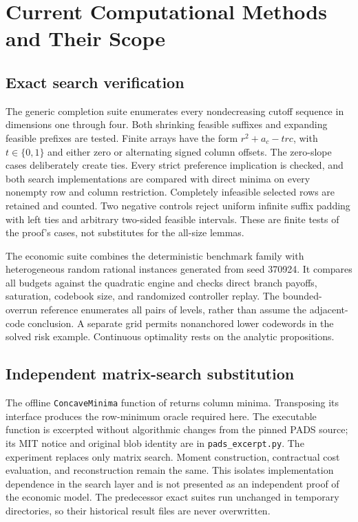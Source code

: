 \section{Current Computational Methods and Their Scope}\label{ec:r37-methods}
\subsection{Exact search verification}
The generic completion suite enumerates every nondecreasing cutoff sequence in dimensions one through four. Both shrinking feasible suffixes and expanding feasible prefixes are tested. Finite arrays have the form $r^2+a_c-trc$, with $t\in\{0,1\}$ and either zero or alternating signed column offsets. The zero-slope cases deliberately create ties. Every strict preference implication is checked, and both search implementations are compared with direct minima on every nonempty row and column restriction. Completely infeasible selected rows are retained and counted. Two negative controls reject uniform infinite suffix padding with left ties and arbitrary two-sided feasible intervals. These are finite tests of the proof's cases, not substitutes for the all-size lemmas.

The economic suite combines the deterministic benchmark family with heterogeneous random rational instances generated from seed 370924. It compares all budgets against the quadratic engine and checks direct branch payoffs, saturation, codebook size, and randomized controller replay. The bounded-overrun reference enumerates all pairs of levels, rather than assume the adjacent-code conclusion. A separate grid permits nonanchored lower codewords in the solved risk example. Continuous optimality rests on the analytic propositions.

\subsection{Independent matrix-search substitution}
The offline \texttt{ConcaveMinima} function of \citet{EppsteinPADS} returns column minima. Transposing its interface produces the row-minimum oracle required here. The executable function is excerpted without algorithmic changes from the pinned PADS source; its MIT notice and original blob identity are in \texttt{pads\_excerpt.py}. The experiment replaces only matrix search. Moment construction, contractual cost evaluation, and reconstruction remain the same. This isolates implementation dependence in the search layer and is not presented as an independent proof of the economic model. The predecessor exact suites run unchanged in temporary directories, so their historical result files are never overwritten.

